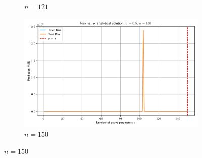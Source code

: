 \documentclass{article}
\begin{document}
\begin{figure}[htb]
\begin{subfigure}[b]{\imgwidth}
    \caption{$n=121$}\label{fig:2k}
  \end{subfigure}%
  \hfill
  \begin{subfigure}[b]{\imgwidth}
    \includegraphics[width=\linewidth]{img2/risk_curve_n150.png}
    \caption{$n=150$}\label{fig:2l}
  \end{subfigure}

  \medskip


\end{figure}
\end{document}
